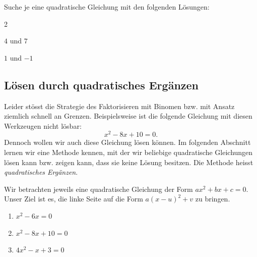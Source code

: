 \documentclass[11pt,oneside]{article}
\begin{document}
	\begin{aufgabe}[Konstruieren]
		Suche je eine quadratische Gleichung mit den folgenden Lösungen:
		\begin{enumerate}[label=\alph*)]\end{enumerate}
	\end{aufgabe}

\subsection{Lösen durch quadratisches Ergänzen}
	Leider stösst die Strategie des Faktorisieren mit Binomen bzw. mit Ansatz ziemlich schnell an Grenzen. Beispielsweise ist die folgende Gleichung mit diesen Werkzeugen nicht lösbar: \[x^2-8x+10=0.\]
	Dennoch wollen wir auch diese Gleichung lösen können. Im folgenden Abschnitt lernen wir eine Methode kennen, mit der wir beliebige quadratische Gleichungen lösen kann bzw. zeigen kann, dass sie keine Lösung besitzen. Die Methode heisst \textit{quadratisches Ergänzen}.
	\begin{beispiel}
		Wir betrachten jeweils eine quadratische Gleichung der Form $ax^2+bx+c=0$. Unser Ziel ist es, die linke Seite auf die Form $a(x-u)^2+v$ zu bringen.
		\begin{enumerate}[label=\alph*)]
			\item $x^2-6x=0$
		\end{enumerate}\newpage
		\begin{enumerate}[label=\alph*)]
			\setcounter{enumi}{1}
			\item $x^2-8x+10=0$
		\end{enumerate}
		\begin{enumerate}[label=\alph*)]
			\setcounter{enumi}{2}
			\item $4x^2-x+3=0$
		\end{enumerate}
	\end{beispiel}
\end{document}
